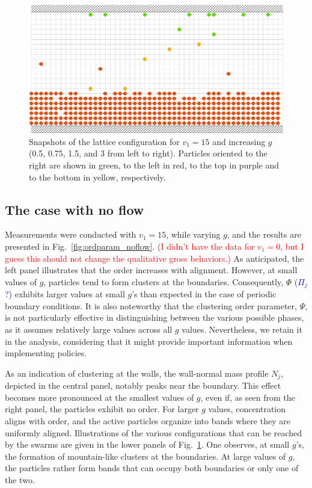 \documentclass[aps,prl,twocolumn,amsmath,amssymb,superscriptaddress]{revtex4-1}
\newcommand{\obs}[1]{\textcolor{red}{#1}}
\newcommand{\CC}[1]
{\textcolor{blue}{#1}}
\begin{document}
\begin{figure}[t!]
   \includegraphics[width=.25\textwidth]{snap_g3_v1_15_t2e6}
   \caption{\label{fig:snapshots} Snapshots of the lattice configuration for $v_1=15$ and increasing $g$ (0.5, 0.75, 1.5, and 3 from left to right). Particles oriented to the right are shown in green, to the left in red, to the top in purple and to the bottom in yellow, respectively.}
\end{figure}

\subsection{The case with no flow}
Measurements were conducted with $v_1=15$, while varying $g$, and the results are presented in Fig.~\ref{fig:ordparam_noflow}. \obs{(I didn't have the data for $v_1=0$, but I guess this should not change the qualitative gross behaviors.)} As anticipated, the left panel illustrates that the order increases with alignment. However, at small values of $g$, particles tend to form clusters at the boundaries. Consequently, $\Phi$ \CC{($\Pi_j$ ?)} exhibits larger values at small $g$'s than expected in the case of periodic boundary conditions. It is also noteworthy that the clustering order parameter, $\Psi$, is not particularly effective in distinguishing between the various possible phases, as it assumes relatively large values across all $g$ values. Nevertheless, we retain it in the analysis, considering that it might provide important information when implementing policies.

As an indication of clustering at the walls, the wall-normal mass profile $N_j$, depicted in the central panel, notably peaks near the boundary. This effect becomes more pronounced at the smallest values of $g$, even if, as seen from the right panel, the particles exhibit no order. For larger $g$ values, concentration aligns with order, and the active particles organize into bands where they are uniformly aligned. Illustrations of the various configurations that can be reached by the swarms are given in the lower panels of Fig.~\ref{fig:snapshots}. One observes, at small $g$'s, the formation of mountain-like clusters at the boundaries. At large values of $g$, the particles rather form bands that can occupy both boundaries or only one of the two.
\end{document}
